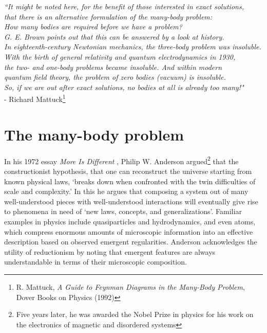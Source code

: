 	\begin{flushright}
	{\fontsize{11}{13}\emph{
	``It might be noted here, for the benefit of those interested in exact solutions, \\
	that there is an alternative formulation of the many-body problem:\\
	How many bodies are required before we have a problem? \\
	G.	E.	Brown points out that this can be answered by a look at history.	\\
	In eighteenth-century Newtonian mechanics,
	the three-body problem was insoluble.\\
	With the birth of general relativity and quantum electrodynamics in 1930,\\ 
	the two- and one-body problems became insoluble.
	And within modern\\
	quantum field theory, the problem of zero bodies (vacuum) is insoluble.\\
	So, if we are out after exact solutions, no bodies at all is already too many!"}\\
	- Richard Mattuck\footnote{R.
	Mattuck, \emph{A Guide to Feynman Diagrams in the Many-Body Problem}, Dover Books on Physics (1992)}}
	\end{flushright}


\section{The many-body problem}


	In his 1972 essay \emph{More Is Different} \cite{Anderson72},  Philip W. Anderson argued\footnote{Five years later, he was awarded the Nobel Prize in physics for his work on the electronics of magnetic and disordered systems} that the constructionist hypothesis, that one can reconstruct the universe starting from known physical laws,  `breaks down when confronted with the twin difficulties of scale and complexity.' 
	In this he argues that composing a system out of many well-understood pieces with well-understood interactions will eventually give rise to  phenomena in need of `new laws, concepts, and generalizations'.
	Familiar examples in physics include quasiparticles and hydrodynamics, and even atoms, which compress enormous amounts of microscopic information into an effective description based on observed emergent regularities.
	Anderson acknowledges the utility of reductionism by noting that emergent features are always understandable in terms of their microscopic composition.


